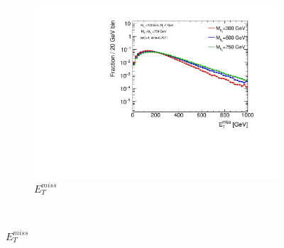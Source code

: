 \begin{figure}
  \centering
  
  \begin{subfigure}[b]{0.7\textwidth}
    \includegraphics[width=\textwidth]{texinputs/04_grid/figures/DMHF/benchmarking/MDM_1_Ma_700_sinp_0.7071_tanb_1.0_SCAN_MA/metlog.pdf}
    \caption{$E_{T}^{miss}$}
  \end{subfigure}\\
  

\end{figure}
